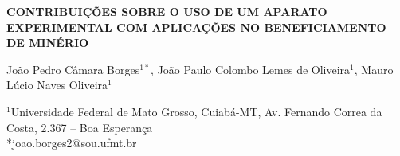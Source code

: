\documentclass[a4paper,12pt,fleqn]{article}
\begin{document}
	\vspace*{2.5cm}

	\begin{center}
		{\bfseries\fontsize{14}{16}\selectfont CONTRIBUIÇÕES SOBRE O USO DE UM APARATO EXPERIMENTAL COM APLICAÇÕES NO BENEFICIAMENTO DE MINÉRIO}
	\end{center}

	\begin{center}
		{\fontsize{12}{14}\selectfont João Pedro Câmara Borges$^{1*}$, João Paulo Colombo Lemes de Oliveira$^{1}$, Mauro Lúcio Naves Oliveira$^{1}$}
		
		\vspace{0.3cm}

		{\fontsize{10}{12}\selectfont
			$^{1}$Universidade Federal de Mato Grosso, Cuiabá-MT, Av. Fernando Correa da Costa, 2.367 – Boa Esperança \\
			*joao.borges2@sou.ufmt.br %
		}
	\end{center}

	\begin{justify}

	\end{justify}
\end{document}
